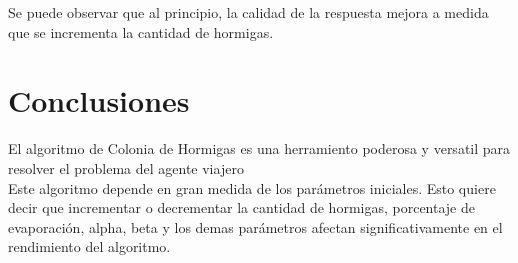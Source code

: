 \documentclass[]{report}
\begin{document}
	Se puede observar que al principio, la calidad de la respuesta mejora a medida que se incrementa la cantidad de hormigas.
	
	\section{Conclusiones}
	El algoritmo de Colonia de Hormigas es una herramiento poderosa y versatil para resolver el problema del agente viajero\\
	
	Este algoritmo depende en gran medida de los parámetros iniciales. Esto quiere decir que incrementar o decrementar la cantidad de hormigas, porcentaje de evaporación, alpha, beta y los demas parámetros afectan significativamente en el rendimiento del algoritmo.
	
\end{document}
